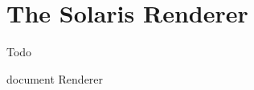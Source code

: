 \chapter{The Solaris Renderer }
\hypertarget{renderer}{}\label{renderer}
\begin{DoxyRefDesc}{Todo}
\item[\doxymbox{\hyperlink{todo__todo000001}{Todo}}]document {\ttfamily Renderer}\end{DoxyRefDesc}
